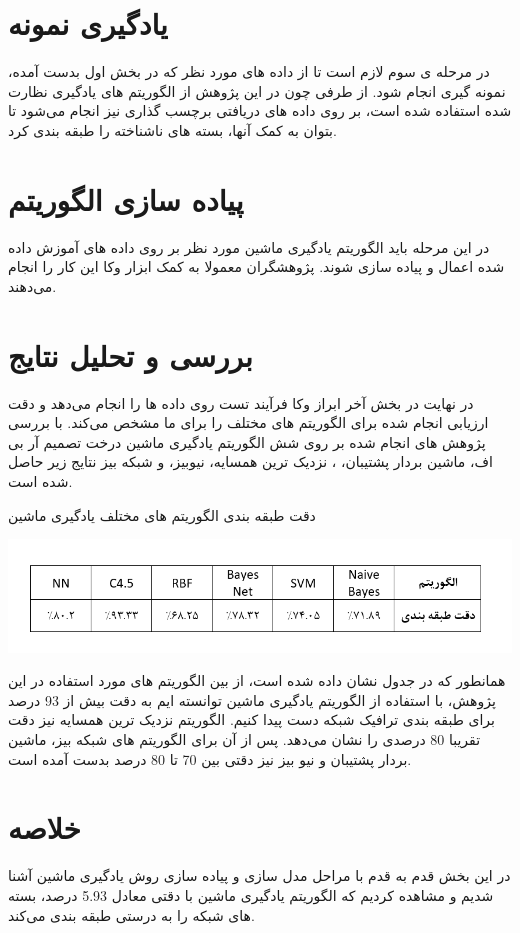 \section{یادگیری نمونه}
در مرحله ی سوم لازم است تا از داده های مورد نظر که در بخش اول بدست آمده، نمونه گیری انجام شود. از طرفی چون در این پژوهش از الگوریتم های یادگیری نظارت شده استفاده شده است، بر روی داده های دریافتی برچسب گذاری نیز انجام می‌شود تا بتوان به کمک آنها، بسته های ناشناخته را طبقه بندی کرد.

\section{پیاده سازی الگوریتم}
در این مرحله باید الگوریتم یادگیری ماشین مورد نظر بر روی داده های آموزش داده شده اعمال و پیاده سازی شوند. پژوهشگران معمولا به کمک ابزار وکا  این کار را انجام می‌دهند.


\section{بررسی و تحلیل نتایج}
در نهایت در بخش آخر ابراز وکا فرآیند تست روی داده ها را انجام می‌دهد و دقت ارزیابی انجام شده برای الگوریتم های مختلف را برای ما مشخص می‌کند.
با بررسی پژوهش های انجام شده بر روی شش الگوریتم یادگیری ماشین درخت تصمیم آر بی اف، ماشین بردار پشتیبان، ، نزدیک ترین همسایه، نیوبیز، و شبکه بیز نتایج زیر حاصل شده است. \cite{shafiq2016network, jamuna2013efficient}

\begin{table}[!h]
\caption{دقت طبقه بندی الگوریتم های مختلف یادگیری ماشین}
\centerline{\includegraphics[width=1\textwidth]{accuracy.PNG}}
\end{table}

همانطور که در جدول نشان داده شده است، از بین الگوریتم های مورد استفاده در این پژوهش، با استفاده از الگوریتم یادگیری ماشین  توانسته ایم به دقت بیش از 93 درصد برای طبقه بندی ترافیک شبکه دست پیدا کنیم. الگوریتم نزدیک ترین همسایه نیز دقت تقریبا 80 درصدی را نشان می‌دهد. پس از آن برای الگوریتم های شبکه بیز، ماشین بردار پشتیبان و نیو بیز نیز دقتی بین 70 تا 80 درصد بدست آمده است.


\section{خلاصه}

در این بخش قدم به قدم با مراحل مدل سازی و پیاده سازی روش یادگیری ماشین آشنا شدیم و مشاهده کردیم که الگوریتم یادگیری ماشین  با دقتی معادل 5.93 درصد، بسته های شبکه را به درستی طبقه بندی می‌کند.